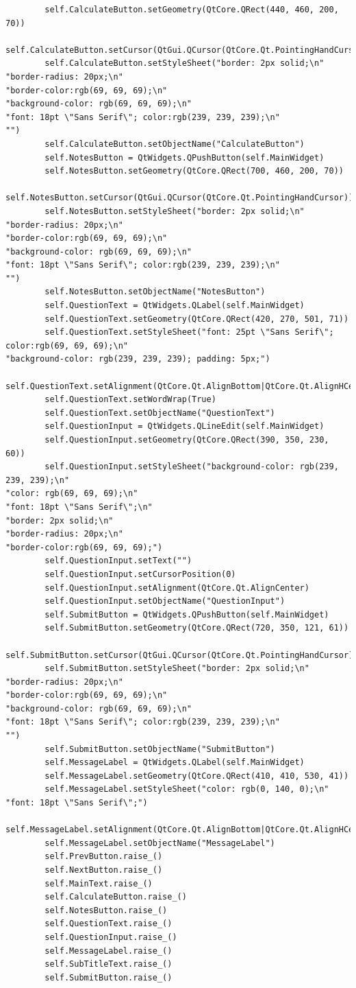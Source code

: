 \documentclass{article}
\begin{document}
\begin{lstlisting}
        self.CalculateButton.setGeometry(QtCore.QRect(440, 460, 200, 70))
        self.CalculateButton.setCursor(QtGui.QCursor(QtCore.Qt.PointingHandCursor))
        self.CalculateButton.setStyleSheet("border: 2px solid;\n"
"border-radius: 20px;\n"
"border-color:rgb(69, 69, 69);\n"
"background-color: rgb(69, 69, 69);\n"
"font: 18pt \"Sans Serif\"; color:rgb(239, 239, 239);\n"
"")
        self.CalculateButton.setObjectName("CalculateButton")
        self.NotesButton = QtWidgets.QPushButton(self.MainWidget)
        self.NotesButton.setGeometry(QtCore.QRect(700, 460, 200, 70))
        self.NotesButton.setCursor(QtGui.QCursor(QtCore.Qt.PointingHandCursor))
        self.NotesButton.setStyleSheet("border: 2px solid;\n"
"border-radius: 20px;\n"
"border-color:rgb(69, 69, 69);\n"
"background-color: rgb(69, 69, 69);\n"
"font: 18pt \"Sans Serif\"; color:rgb(239, 239, 239);\n"
"")
        self.NotesButton.setObjectName("NotesButton")
        self.QuestionText = QtWidgets.QLabel(self.MainWidget)
        self.QuestionText.setGeometry(QtCore.QRect(420, 270, 501, 71))
        self.QuestionText.setStyleSheet("font: 25pt \"Sans Serif\"; color:rgb(69, 69, 69);\n"
"background-color: rgb(239, 239, 239); padding: 5px;")
        self.QuestionText.setAlignment(QtCore.Qt.AlignBottom|QtCore.Qt.AlignHCenter)
        self.QuestionText.setWordWrap(True)
        self.QuestionText.setObjectName("QuestionText")
        self.QuestionInput = QtWidgets.QLineEdit(self.MainWidget)
        self.QuestionInput.setGeometry(QtCore.QRect(390, 350, 230, 60))
        self.QuestionInput.setStyleSheet("background-color: rgb(239, 239, 239);\n"
"color: rgb(69, 69, 69);\n"
"font: 18pt \"Sans Serif\";\n"
"border: 2px solid;\n"
"border-radius: 20px;\n"
"border-color:rgb(69, 69, 69);")
        self.QuestionInput.setText("")
        self.QuestionInput.setCursorPosition(0)
        self.QuestionInput.setAlignment(QtCore.Qt.AlignCenter)
        self.QuestionInput.setObjectName("QuestionInput")
        self.SubmitButton = QtWidgets.QPushButton(self.MainWidget)
        self.SubmitButton.setGeometry(QtCore.QRect(720, 350, 121, 61))
        self.SubmitButton.setCursor(QtGui.QCursor(QtCore.Qt.PointingHandCursor))
        self.SubmitButton.setStyleSheet("border: 2px solid;\n"
"border-radius: 20px;\n"
"border-color:rgb(69, 69, 69);\n"
"background-color: rgb(69, 69, 69);\n"
"font: 18pt \"Sans Serif\"; color:rgb(239, 239, 239);\n"
"")
        self.SubmitButton.setObjectName("SubmitButton")
        self.MessageLabel = QtWidgets.QLabel(self.MainWidget)
        self.MessageLabel.setGeometry(QtCore.QRect(410, 410, 530, 41))
        self.MessageLabel.setStyleSheet("color: rgb(0, 140, 0);\n"
"font: 18pt \"Sans Serif\";")
        self.MessageLabel.setAlignment(QtCore.Qt.AlignBottom|QtCore.Qt.AlignHCenter)
        self.MessageLabel.setObjectName("MessageLabel")
        self.PrevButton.raise_()
        self.NextButton.raise_()
        self.MainText.raise_()
        self.CalculateButton.raise_()
        self.NotesButton.raise_()
        self.QuestionText.raise_()
        self.QuestionInput.raise_()
        self.MessageLabel.raise_()
        self.SubTitleText.raise_()
        self.SubmitButton.raise_()


\end{lstlisting}
\end{document}
